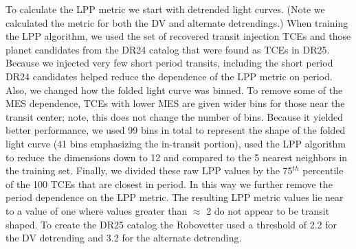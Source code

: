 To calculate the LPP metric we start with detrended \kepler{} light curves. (Note we calculated the metric for both the DV and alternate detrendings.)  When training the LPP algorithm, we used the set of recovered transit injection TCEs and those planet candidates from the DR24 catalog \citep{Coughlin2016cat} that were found as TCEs in DR25.  Because we injected very few short period transits, including the short period DR24 candidates helped reduce the dependence of the LPP metric on period.  Also, we changed how the folded light curve was binned. To remove some of the MES dependence, TCEs with lower MES are given wider bins for those near the transit center; note, this does not change the number of bins. Because it yielded better performance, we used 99 bins in total to represent the shape of the folded light curve (41 bins emphasizing the in-transit portion), used the LPP algorithm to reduce the dimensions down to 12 and compared to the 5 nearest neighbors in the training set.  Finally, we divided these raw LPP values by the 75$^{th}$ percentile of the 100 TCEs that are closest in period. 
In this way we further remove the period dependence on the LPP metric.  The resulting LPP metric values lie near to a value of one where values greater than $\approx$ 2 do not appear to be transit shaped.  To create the DR25 catalog the Robovetter used a threshold of 2.2 for the DV detrending and 3.2 for the alternate detrending.



